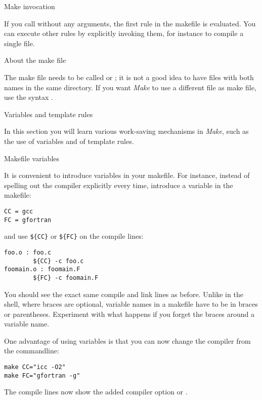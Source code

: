  {Make invocation}

If you call  without any arguments,
the first rule in the makefile is evaluated. You can execute other
rules by explicitly invoking them, for instance  to
compile a single file.


 {About the make file}

The make file needs to be called  or
; it is not a good idea to have files with both names in
the same directory.
If you want \emph{Make} to use a different file as make file, use the
syntax .

 {Variables and template rules}

\begin{purpose}
  In this section you will learn various work-saving mechanisms in
  \emph{Make}, such as the use of variables and of template rules.
\end{purpose}

 {Makefile variables}

It is convenient to introduce variables in your makefile.
For instance, 
instead of spelling out the compiler explicitly every time, introduce a
variable in the makefile:
\begin{lstlisting}
CC = gcc
FC = gfortran
\end{lstlisting}
and use \verb+${CC}+ or \verb+${FC}+ on the compile lines:
\begin{lstlisting}
foo.o : foo.c
        ${CC} -c foo.c
foomain.o : foomain.F
        ${FC} -c foomain.F
\end{lstlisting}
  {You should see the exact same compile and link lines as before.}
  {Unlike in the shell, where braces are optional, variable names in a
    makefile have to be in
    braces or parentheses. Experiment with what happens if you forget
    the braces around a variable name.}

One
advantage of using variables is that you can now change the compiler
from the commandline:
\begin{lstlisting}
make CC="icc -O2"
make FC="gfortran -g"
\end{lstlisting}

  {The compile lines now show the added compiler option  or .}{}

